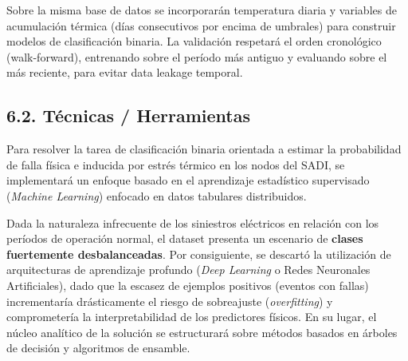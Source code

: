 Sobre la misma base de datos se incorporarán temperatura diaria y variables de acumulación térmica (días consecutivos por encima de umbrales) para construir modelos de clasificación binaria. La validación respetará el orden cronológico (walk-forward), entrenando sobre el período más antiguo y evaluando sobre el más reciente, para evitar data leakage temporal.

\hypertarget{tuxe9cnicas-herramientas}{%
\subsection{6.2. Técnicas / Herramientas}\label{tuxe9cnicas-herramientas}}

Para resolver la tarea de clasificación binaria orientada a estimar la probabilidad de falla física e inducida por estrés térmico en los nodos del SADI, se implementará un enfoque basado en el aprendizaje estadístico supervisado (\emph{Machine Learning}) enfocado en datos tabulares distribuidos.

Dada la naturaleza infrecuente de los siniestros eléctricos en relación con los períodos de operación normal, el dataset presenta un escenario de \textbf{clases fuertemente desbalanceadas}. Por consiguiente, se descartó la utilización de arquitecturas de aprendizaje profundo (\emph{Deep Learning} o Redes Neuronales Artificiales), dado que la escasez de ejemplos positivos (eventos con fallas) incrementaría drásticamente el riesgo de sobreajuste (\emph{overfitting}) y comprometería la interpretabilidad de los predictores físicos. En su lugar, el núcleo analítico de la solución se estructurará sobre métodos basados en árboles de decisión y algoritmos de ensamble.

